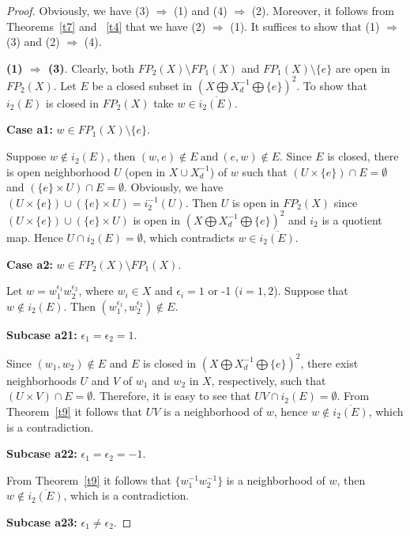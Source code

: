 \documentclass{amsart}
\theoremstyle{definition}
\begin{document}
\begin{proof}
Obviously, we have (3) $\Rightarrow$ (1) and (4) $\Rightarrow$ (2). Moreover, it follows from Theorems~\ref{t7} and ~\ref{t4} that we have (2) $\Rightarrow$ (1). It suffices to show that (1) $\Rightarrow$ (3) and (2) $\Rightarrow$ (4).

{\bf (1) $\Rightarrow$ (3)}. Clearly,  both $FP_{2}(X)\setminus FP_{1}(X)$ and $FP_{1}(X)\setminus\{e\}$ are open in $FP_{2}(X)$. Let $E$ be a closed subset in $(X\bigoplus X_{d}^{-1}\bigoplus\{e\})^{2}$. To show that $i_{2}(E)$ is closed in $FP_{2}(X)$ take $w\in \overline{i_{2}(E)}$.

{\bf Case a1:} $w\in FP_{1}(X)\setminus\{e\}$.

Suppose $w\notin i_2(E)$, then $(w, e)\notin E\ \mbox{and}\ (e, w)\notin E$. Since $E$ is closed, there is open neighborhood $U$ (open in $X\cup X_{d}^{-1}$) of $w$ such that $(U\times \{e\})\cap E= \emptyset$ and $(\{e\}\times U)\cap E= \emptyset$. Obviously, we have $(U\times \{e\})\cup (\{e\}\times U)=i_2^{-1}(U)$. Then $U$ is open in $FP_2(X)$ since $(U\times \{e\})\cup (\{e\}\times U)$ is open in $(X\bigoplus X_{d}^{-1}\bigoplus\{e\})^{2}$ and $i_2$ is a quotient map. Hence $U\cap i_2(E)=\emptyset$, which contradicts $w\in \overline{i_2(E)}$.

{\bf Case a2:} $w\in FP_{2}(X)\setminus FP_{1}(X)$.

Let $w=w_{1}^{\epsilon_{1}}w_{2}^{\epsilon_{2}}$, where $w_{i}\in X$ and $\epsilon_{i}=1$ or -1 ($i=1, 2$). Suppose that $w\not\in i_2(E)$. Then $(w_{1}^{\epsilon_{1}}, w_{2}^{\epsilon_{2}})\not\in E$.

{\bf Subcase a21:} $\epsilon_{1}=\epsilon_{2}=1$.

Since $(w_{1}, w_{2})\not\in E$ and $E$ is closed in $(X\bigoplus X_{d}^{-1}\bigoplus\{e\})^{2}$,  there exist neighborhoods $U$ and $V$ of $w_{1}$ and $w_{2}$ in $X$, respectively, such that
$(U\times V)\cap E=\emptyset$. Therefore, it is easy to see that $UV\cap i_2(E)=\emptyset$. From Theorem~\ref{t9} it follows that $UV$ is a neighborhood of $w$, hence $w\not\in\overline{i_2(E)}$, which is a contradiction.

{\bf Subcase a22:} $\epsilon_{1}=\epsilon_{2}=-1$.

From Theorem~\ref{t9} it follows that $\{w_{1}^{-1}w_{2}^{-1}\}$ is a neighborhood of $w$, then $w\not\in\overline{i_2(E)}$, which is a contradiction.

{\bf Subcase a23:} $\epsilon_{1}\neq\epsilon_{2}$.


\end{proof}
\end{document}
